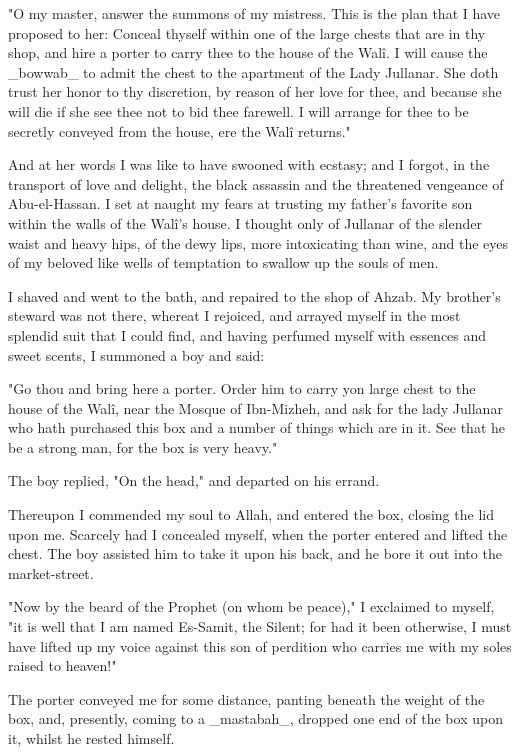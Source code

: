 "O my master, answer the summons of my mistress. This is the plan that
I have proposed to her: Conceal thyself within one of the large chests
that are in thy shop, and hire a porter to carry thee to the house of
the Walî. I will cause the _bowwab_ to admit the chest to the
apartment of the Lady Jullanar. She doth trust her honor to thy
discretion, by reason of her love for thee, and because she will die
if she see thee not to bid thee farewell. I will arrange for thee to
be secretly conveyed from the house, ere the Walî returns."

And at her words I was like to have swooned with ecstasy; and I
forgot, in the transport of love and delight, the black assassin and
the threatened vengeance of Abu-el-Hassan. I set at naught my fears at
trusting my father's favorite son within the walls of the Walî's
house. I thought only of Jullanar of the slender waist and heavy hips,
of the dewy lips, more intoxicating than wine, and the eyes of my
beloved like wells of temptation to swallow up the souls of men.

I shaved and went to the bath, and repaired to the shop of Ahzab. My
brother's steward was not there, whereat I rejoiced, and arrayed
myself in the most splendid suit that I could find, and having
perfumed myself with essences and sweet scents, I summoned a boy and
said:

"Go thou and bring here a porter. Order him to carry yon large chest
to the house of the Walî, near the Mosque of Ibn-Mizheh, and ask for
the lady Jullanar who hath purchased this box and a number of things
which are in it. See that he be a strong man, for the box is very
heavy."

The boy replied, "On the head," and departed on his errand.

Thereupon I commended my soul to Allah, and entered the box, closing
the lid upon me. Scarcely had I concealed myself, when the porter
entered and lifted the chest. The boy assisted him to take it upon
his back, and he bore it out into the market-street.

"Now by the beard of the Prophet (on whom be peace)," I exclaimed to
myself, "it is well that I am named Es-Samit, the Silent; for had it
been otherwise, I must have lifted up my voice against this son of
perdition who carries me with my soles raised to heaven!"

The porter conveyed me for some distance, panting beneath the weight
of the box, and, presently, coming to a _mastabah_, dropped one end
of the box upon it, whilst he rested himself.

